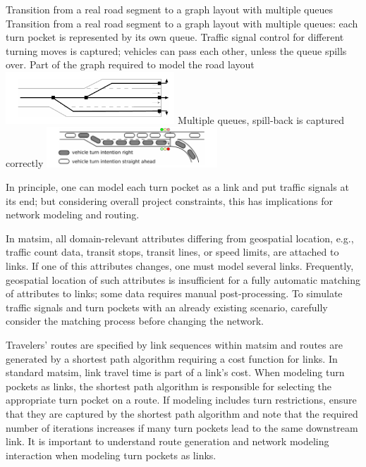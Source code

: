 \createfigure%
{Transition from a real road segment to a graph layout with multiple queues}%
{Transition from a real road segment to a graph layout with multiple queues: each turn pocket is represented by its own queue. Traffic signal control for different turning moves is captured; vehicles can pass each other, unless the queue spills over. }
{\label{fig:lanes_representation}}%
{%
  \createsubfigure%
	{Part of the graph required to model the road layout}
	{\includegraphics[width=0.475\textwidth]{extending/figures/signalslanes/link_lanes_layout}}
	{\label{fig:model_link_layout}}
  \createsubfigure%
	{Multiple queues, spill-back is captured correctly}%
	{\includegraphics[width=0.48\textwidth]{extending/figures/signalslanes/multiple_queue_model_inkscape.pdf}}%
	{\label{fig:lanes_representation_multiple_queue}}%
}%
{\citet{GretherNeumannNagel2012SignalsQueueModelABMTrans}}

In principle, one can model each turn pocket as a link and put traffic signals at its end; 
but considering overall project constraints, this has implications for network modeling and routing. 

In \gls{matsim}, all domain-relevant attributes differing from geospatial location, e.g., traffic count data, transit stops, transit lines, or speed limits, are attached to links. 
If one of this attributes changes, one must model several links. 
Frequently, geospatial location of such attributes is insufficient for a fully automatic matching of attributes to links; 
some data requires manual post-processing. 
To simulate traffic signals and turn pockets with an already existing scenario, carefully consider the matching process before changing the network.  

Travelers' routes are specified by link sequences within \gls{matsim} and 
routes are generated by a shortest path algorithm requiring a cost function for links. 
In standard \gls{matsim}, link travel time is part of a link's cost.
When modeling turn pockets as links, the shortest path algorithm is responsible for selecting the appropriate turn pocket on a route.
If modeling includes turn restrictions, ensure that they are captured by the shortest path algorithm and note that 
the required number of iterations increases if many turn pockets lead to the same downstream link. 
It is important to understand route generation and network modeling interaction when modeling turn pockets as links. 

